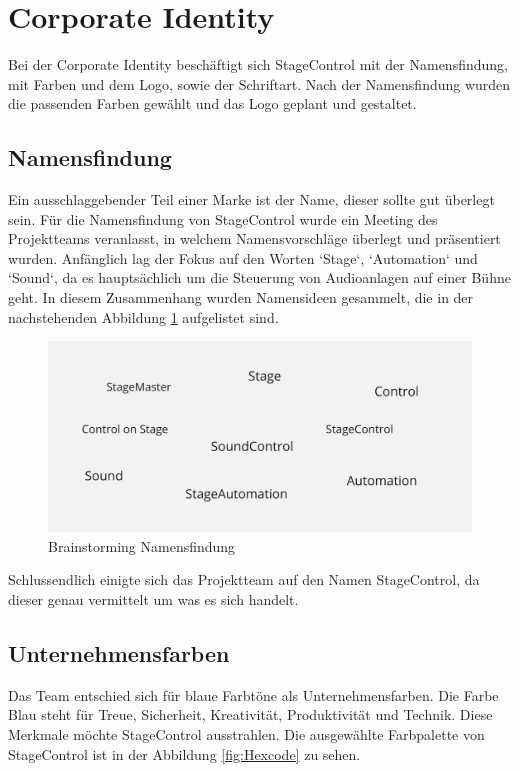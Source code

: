 \section{Corporate Identity}
Bei der Corporate Identity beschäftigt sich StageControl mit der Namensfindung, mit Farben und dem Logo, sowie der Schriftart. Nach der Namensfindung wurden die passenden Farben gewählt und das Logo geplant und gestaltet.

\subsection{Namensfindung}
Ein ausschlaggebender Teil einer Marke ist der Name, dieser sollte gut überlegt sein. Für die Namensfindung von StageControl wurde ein Meeting des Projektteams veranlasst, in welchem Namensvorschläge überlegt und präsentiert wurden. 
Anfänglich lag der Fokus auf den Worten ‘Stage‘, ‘Automation‘ und ‘Sound‘, da es hauptsächlich um die Steuerung von Audioanlagen auf einer Bühne geht. In diesem Zusammenhang wurden Namensideen gesammelt, die in der nachstehenden Abbildung \ref{fig:Brainstorming_Namensfindung} aufgelistet sind. 

\begin{figure}[H]
	\centering
	\includegraphics[width=0.5\linewidth]{images/Brainstorming_Namensfindung.png}
	\caption[Brainstorming Namensfindung]{Brainstorming Namensfindung}
	\label{fig:Brainstorming_Namensfindung}
\end{figure}

Schlussendlich einigte sich das Projektteam auf den Namen StageControl, da dieser genau vermittelt um was es sich handelt.

\newpage
\subsection{Unternehmensfarben}
Das Team entschied sich für blaue Farbtöne als Unternehmensfarben. Die Farbe Blau steht für Treue, Sicherheit, Kreativität, Produktivität und Technik. \parencite{BedeutungderFarbeBlau} Diese Merkmale möchte StageControl ausstrahlen. Die ausgewählte Farbpalette von StageControl ist in der Abbildung \ref{fig:Hexcode} zu sehen. 

